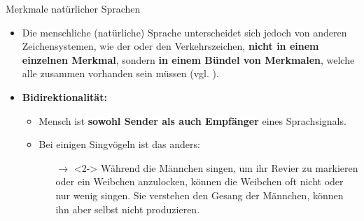 \begin{frame}{Merkmale natürlicher Sprachen}

\begin{itemize}
	\item Die menschliche (natürliche) Sprache unterscheidet sich jedoch von anderen Zeichensystemen, wie der  oder den Verkehrszeichen, \textbf{nicht in einem einzelnen Merkmal}, sondern \textbf{in einem Bündel von Merkmalen}, welche alle zusammen vorhanden sein müssen (vgl. \citet{Hockett60a}).
\end{itemize}

\end{frame}




\begin{frame}

\begin{itemize}
	\item<1-> \bf{Bidirektionalität:}

	\begin{itemize}
		\item[]
		\item<1-> Mensch ist \textbf{sowohl Sender als auch Empfänger} eines Sprachsignals.
		\item[]
		\item<2-> Bei einigen Singvögeln ist das anders:
		
		\begin{itemize}
			\item[]
			\item[$\rightarrow$]<2-> Während die Männchen singen, um ihr Revier zu markieren oder ein Weibchen anzulocken, können die Weibchen oft nicht oder nur wenig singen. Sie verstehen den Gesang der Männchen, können ihn aber selbst nicht produzieren.
		\end{itemize}
			
	\end{itemize}

\end{itemize}

\end{frame}



